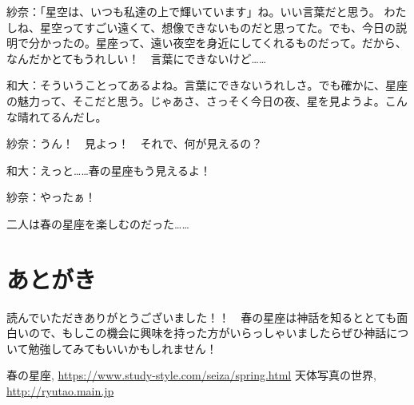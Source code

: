 \documentclass[../../super_nova_2023]{subfiles}
\begin{document}
\phantom{a}\par
紗奈：「星空は、いつも私達の上で輝いています」ね。いい言葉だと思う。
わたしね、星空ってすごい遠くて、想像できないものだと思ってた。でも、今日の説明で分かったの。星座って、遠い夜空を身近にしてくれるものだって。だから、なんだかとてもうれしい！　言葉にできないけど……


\phantom{a}\par
和大：そういうことってあるよね。言葉にできないうれしさ。でも確かに、星座の魅力って、そこだと思う。じゃあさ、さっそく今日の夜、星を見ようよ。こんな晴れてるんだし。


\phantom{a}\par
紗奈：うん！　見よっ！　それで、何が見えるの？


\phantom{a}\par
和大：えっと……春の星座もう見えるよ！


\phantom{a}\par
紗奈：やったぁ！　


\phantom{a}\par
二人は春の星座を楽しむのだった……


\phantom{a}\par
{}
{}
\section*{あとがき}
読んでいただきありがとうございました！！　春の星座は神話を知るととても面白いので、もしこの機会に興味を持った方がいらっしゃいましたらぜひ神話について勉強してみてもいいかもしれません！ 

\begin{thebibliography}{1}
	 春の星座, \url{https://www.study-style.com/seiza/spring.html}
	 天体写真の世界, \url{http://ryutao.main.jp}
\end{thebibliography}
\end{document}
